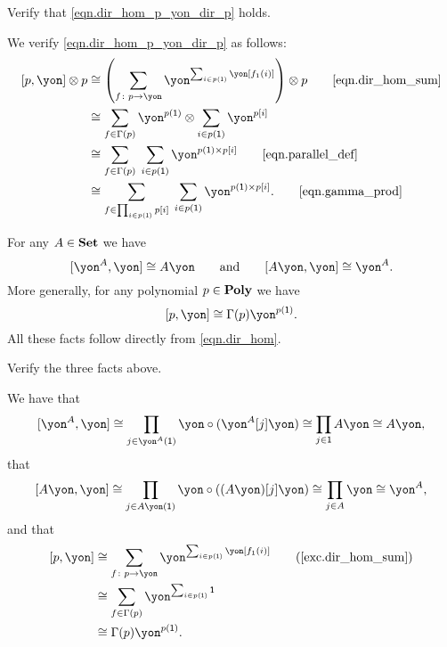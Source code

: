 \documentclass[Book-Poly]{subfiles}
\begin{document}
\begin{exercise} \label{exc.dir_hom_p_yon_dir_p}
Verify that \eqref{eqn.dir_hom_p_yon_dir_p} holds.
\begin{solution}
We verify \eqref{eqn.dir_hom_p_yon_dir_p} as follows:
\begin{align*}
    \ihom{p, \yon} \otimes p
    &\iso
    \left(\sum_{f \colon p \to \yon} \yon^{\sum_{i \in p(\1)} \yon[f_1(i)]}\right) \otimes p
    \tag*{\eqref{eqn.dir_hom_sum}} \\
    &\iso
    \sum_{f \in \Gamma(p)} \yon^{p(\1)} \otimes \sum_{i \in p(\1)} \yon^{p[i]} \\
    &\iso
    \sum_{f \in \Gamma(p)} \; \sum_{i \in p(\1)} \yon^{p(\1) \times p[i]}
    \tag*{\eqref{eqn.parallel_def}} \\
    &\iso
    \sum_{f \in \prod_{i \in p(\1)} p[i]} \; \sum_{i \in p(\1)} \yon^{p(\1) \times p[i]}.
    \tag*{\eqref{eqn.gamma_prod}}
\end{align*}
\end{solution}
\end{exercise}

\begin{example}\label{ex.dirichlet_dual}
For any $A\in\mathbf{Set}$ we have
\[
  \ihom{\yon^A,\yon} \iso A\yon
  \qqand
  \ihom{A\yon,\yon} \iso \yon^A.
\]
More generally, for any polynomial $p\in\mathbf{Poly}$ we have
\begin{equation}\label{eqn.dir_dual}
  \ihom{p,\yon} \iso \Gamma(p)\yon^{p(\1)}.
\end{equation}
All these facts follow directly from \eqref{eqn.dir_hom}.
\end{example}

\begin{exercise}
Verify the three facts above.
\begin{solution}
We have that
\[
    \ihom{\yon^A, \yon} \iso \prod_{j \in \yon^A(\1)} \yon \circ (\yon^A[j]\yon) \iso \prod_{j \in \1} A\yon \iso A\yon,
\]
that
\[
    \ihom{A\yon, \yon} \iso \prod_{j \in A\yon(\1)} \yon \circ ((A\yon)[j]\yon) \iso \prod_{j \in A} \yon \iso \yon^A,
\]
and that
\begin{align*}
    \ihom{p, \yon} &\iso \sum_{f \colon p \to \yon} \yon^{\sum_{i \in p(\1)} \yon[f_1(i)]} \tag{\cref{exc.dir_hom_sum}} \\
    &\iso \sum_{f \in \Gamma(p)} \yon^{\sum_{i \in p(\1)} \1} \\
    &\iso \Gamma(p)\yon^{p(\1)}.
\end{align*}
\end{solution}
\end{exercise}
\end{document}
